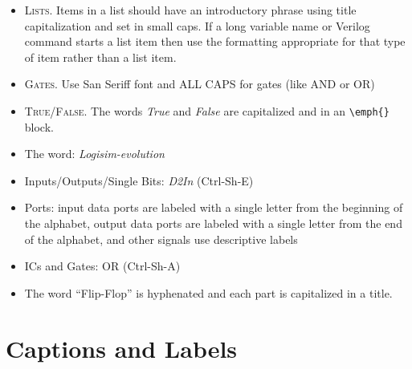 \begin{itemize}
  \item \textsc{Lists}. Items in a list should have an introductory phrase using title capitalization and set in small caps. If a long variable name or Verilog command starts a list item then use the formatting appropriate for that type of item rather than a list item.
  
  \item \textsc{Gates}. Use San Seriff font and ALL CAPS for gates (like \textsf{AND} or \textsf{OR})
  
  \item \textsc{True/False}. The words \emph{True} and \emph{False} are capitalized and in an \lstinline[columns=fixed]|\emph{}| block.

\item The word: \textit{Logisim-evolution}
\item Inputs/Outputs/Single Bits: \emph{D2In} (Ctrl-Sh-E)
\item Ports: input data ports are labeled with a single letter from the beginning of the alphabet, output data ports are labeled with a single letter from the end of the alphabet, and other signals use descriptive labels
\item ICs and Gates: \textsf{OR} (Ctrl-Sh-A)
\item The word ``Flip-Flop'' is hyphenated and each part is capitalized in a title.


\end{itemize}

\section{Captions and Labels}


